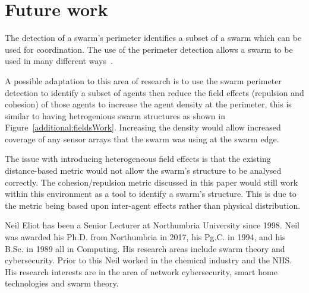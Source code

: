 \documentclass{ieeeaccess}
\begin{document}

\section{Future work\label{metric:Future}}
The detection of a swarm's perimeter \cite{MD:09, MJ:08, ZAPS:07, JG:13} identifies a subset of a swarm which can be used for coordination. The use of the perimeter detection allows a swarm to be used in many different ways~\cite{ZFG:13, AKK:08, APZDAMC:09, AZDPS:11}. 

A possible adaptation to this area of research is to use the swarm perimeter detection to identify a subset of agents then reduce the field effects (repulsion and cohesion) of those agents to increase the agent density at the perimeter, this is similar to having hetrogenious swarm structures as shown in Figure~\ref{additional:fieldsWork}. Increasing the density would allow increased coverage of any sensor arrays that the swarm was using at the swarm edge. 

The issue with introducing heterogeneous field effects is that the existing distance-based metric would not allow the swarm's structure to be analysed correctly. The cohesion/repulsion metric discussed in this paper would still work within this environment as a tool to identify a swarm's structure. This is due to the metric being based upon inter-agent effects rather than physical distribution. 

\newpage




\begin{IEEEbiography}{Neil Eliot}
has been a Senior Lecturer at Northumbria University since 1998.  Neil was awarded his Ph.D. from Northumbria in 2017, his Pg.C. in 1994, and his B.Sc. in 1989 all in Computing. His research areas include swarm theory and cybersecurity. Prior to this Neil worked in the chemical industry and the NHS. His research interests are in the area of network cybersecurity, smart home technologies and swarm theory. 
\end{IEEEbiography}
\end{document}
